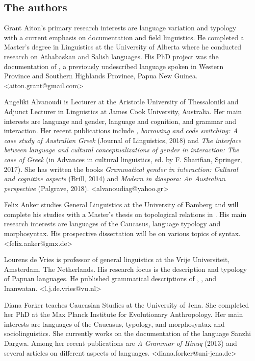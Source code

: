 \begin{refsection}
\subsection*{The authors}

Grant Aiton's primary research interests are language variation and typology with a current emphasis on documentation and field linguistics. He completed a Master's degree in Linguistics at the University of Alberta where he conducted research on Athabaskan and Salish languages. His PhD project was the documentation of , a previously undescribed language spoken in Western Province and Southern Highlands Province, Papua New Guinea. <aiton.grant@gmail.com>

Angeliki Alvanoudi is Lecturer at the Aristotle University of Thessaloniki and Adjunct Lecturer in Linguistics at James Cook University, Australia. Her main interests are language and gender, language and cognition, and grammar and interaction. Her recent publications include \textit{, borrowing and code switching: A case study of Australian Greek} (Journal of  Linguistics, 2018) and \textit{The interface between language and cultural conceptualizations of gender in interaction: The case of Greek} (in Advances in cultural linguistics, ed. by F. Sharifian, Springer, 2017). She has written the books \textit{Grammatical gender in interaction: Cultural and cognitive aspects} (Brill, 2014) and \textit{Modern  in diaspora: An Australian perspective} (Palgrave, 2018). <alvanoudiag@yahoo.gr> 

Felix Anker studies General Linguistics at the University of Bamberg and will complete his studies with a Master’s thesis on topological relations in . His main research interests are languages of the Caucasus, language typology and morphosyntax. His prospective dissertation will be on various topics of  syntax.
<felix.anker@gmx.de>

Lourens de Vries is professor of general linguistics at the Vrije Universiteit, Amsterdam, The Netherlands. His research focus is the description and typology of Papuan languages. He published grammatical descriptions of , ,  and Inanwatan. <l.j.de.vries@vu.nl>

Diana Forker teaches Caucasian Studies at the University of Jena. She completed her PhD at the Max Planck Institute for Evolutionary Anthropology. Her main interests are languages of the Caucasus, typology, and morphosyntax and sociolinguistics. She currently works on the documentation of the  language Sanzhi Dargwa. Among her recent publications are \textit{A Grammar of Hinuq} (2013) and several articles on different aspects of  languages.  <diana.forker@uni-jena.de>


\end{refsection}
